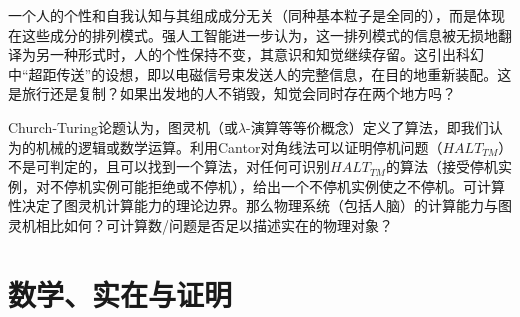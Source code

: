 \par 一个人的个性和自我认知与其组成成分无关（同种基本粒子是全同的），而是体现在这些成分的排列模式。强人工智能进一步认为，这一排列模式的信息被无损地翻译为另一种形式时，人的个性保持不变，其意识和知觉继续存留。这引出科幻中“超距传送”的设想，即以电磁信号束发送人的完整信息，在目的地重新装配。这是旅行还是复制？如果出发地的人不销毁，知觉会同时存在两个地方吗？

\par Church-Turing论题认为，图灵机（或$\lambda$-演算等等价概念）定义了算法，即我们认为的机械的逻辑或数学运算。利用Cantor对角线法可以证明停机问题（$HALT_{TM}$）不是可判定的，且可以找到一个算法，对任何可识别$HALT_{TM}$的算法（接受停机实例，对不停机实例可能拒绝或不停机），给出一个不停机实例使之不停机。可计算性决定了图灵机计算能力的理论边界。那么物理系统（包括人脑）的计算能力与图灵机相比如何？可计算数/问题是否足以描述实在的物理对象？

\section{数学、实在与证明}

